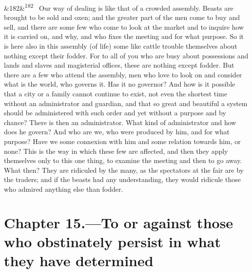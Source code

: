 \documentclass[12pt]{article}
\newcommand{\para}[1][]{\par\noindent\ifx&#1&\else\textsuperscript{\footnotesize #1}~\fi}
\begin{document}
\para[182] Our way of dealing is like that of a crowded assembly. Beasts are brought to be sold and oxen; and the greater part of the men come to buy and sell, and there are some few who come to look at the market and to inquire how it is carried on, and why, and who fixes the meeting and for what purpose. So it is here also in this assembly (of life) some like cattle trouble themselves about nothing except their fodder. For to all of you who are busy about possessions and lands and slaves and magisterial offices, these are nothing except fodder. But there are a few who attend the assembly, men who love to look on and consider what is the world, who governs it. Has it no governor? And how is it possible that a city or a family cannot continue to exist, not even the shortest time without an administrator and guardian, and that so great and beautiful a system should be administered with such order and yet without a purpose and by chance? There is then an administrator. What kind of administrator and how does he govern? And who are we, who were produced by him, and for what purpose? Have we some connexion with him and some relation towards him, or none? This is the way in which these few are affected, and then they apply themselves only to this one thing, to examine the meeting and then to go away. What then? They are ridiculed by the many, as the spectators at the fair are by the traders; and if the beasts had any understanding, they would ridicule those who admired anything else than fodder.

\section*{Chapter 15.---To or against those who obstinately persist in what they have determined}
\end{document}
